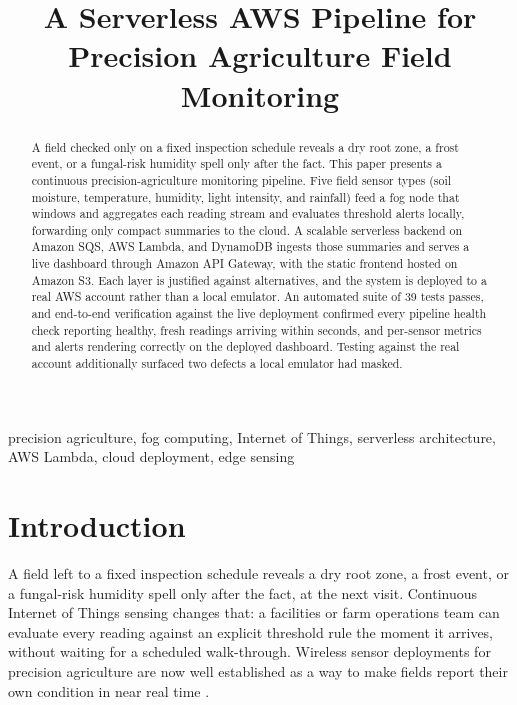 \documentclass[conference]{IEEEtran}
\begin{document}
\title{A Serverless AWS Pipeline for Precision Agriculture Field Monitoring}

\author{
}

\maketitle

\begin{abstract}
A field checked only on a fixed inspection schedule reveals a dry root zone, a frost event, or a fungal-risk humidity spell only after the fact. This paper presents a continuous precision-agriculture monitoring pipeline. Five field sensor types (soil moisture, temperature, humidity, light intensity, and rainfall) feed a fog node that windows and aggregates each reading stream and evaluates threshold alerts locally, forwarding only compact summaries to the cloud. A scalable serverless backend on Amazon SQS, AWS Lambda, and DynamoDB ingests those summaries and serves a live dashboard through Amazon API Gateway, with the static frontend hosted on Amazon S3. Each layer is justified against alternatives, and the system is deployed to a real AWS account rather than a local emulator. An automated suite of 39 tests passes, and end-to-end verification against the live deployment confirmed every pipeline health check reporting healthy, fresh readings arriving within seconds, and per-sensor metrics and alerts rendering correctly on the deployed dashboard. Testing against the real account additionally surfaced two defects a local emulator had masked.
\end{abstract}

\begin{IEEEkeywords}
precision agriculture, fog computing, Internet of Things, serverless architecture, AWS Lambda, cloud deployment, edge sensing
\end{IEEEkeywords}

\section{Introduction}
A field left to a fixed inspection schedule reveals a dry root zone, a frost event, or a fungal-risk humidity spell only after the fact, at the next visit. Continuous Internet of Things sensing changes that: a facilities or farm operations team can evaluate every reading against an explicit threshold rule the moment it arrives, without waiting for a scheduled walk-through. Wireless sensor deployments for precision agriculture are now well established as a way to make fields report their own condition in near real time \cite{ref1}.
\end{document}
